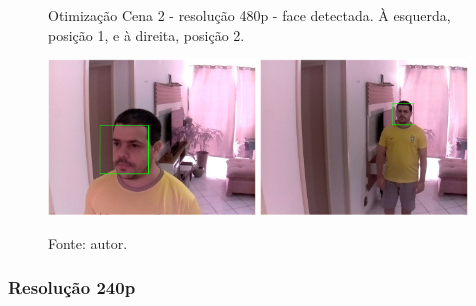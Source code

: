 \begin{figure}[H]
    \centering
    \caption[Otimização Cena 2 - resolução 480p - face detectada. À esquerda posição 1 e à direita, posição 2]{Otimização Cena 2 - resolução 480p - face detectada. À esquerda, posição 1, e à direita, posição 2.}
    \includegraphics[width=0.49\textwidth]{Cap4_Experimentos_Realizados/Figures/cena2_640x480_pos1_face.jpg}
    \includegraphics[width=0.49\textwidth]{Cap4_Experimentos_Realizados/Figures/cena2_640x480_pos2_face.jpg}
    \caption*{Fonte: autor.}
    \label{fig:otimizacaoCena2_480p_faces}
\end{figure}

\subsubsection{Resolução 240p} \label{sssec:resolution2-3}

